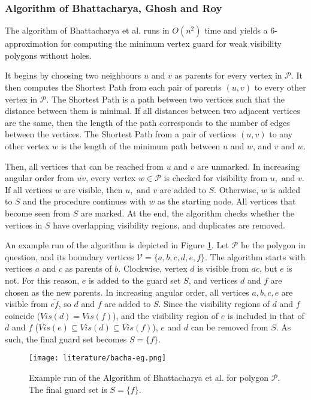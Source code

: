 \subsubsection{Algorithm of Bhattacharya, Ghosh and Roy \cite{bhattacharya2016approximability}}
The algorithm of Bhattacharya et al. \cite{bhattacharya2016approximability} runs in $O(n^2)$ time and yields a 6-approximation for computing the minimum vertex guard for weak visibility polygons without holes. 

It begins by choosing two neighbours $u$ and $v$ as parents for every vertex in $\mathcal P$. It then computes the Shortest Path from each pair of parents $(u, v)$ to every other vertex in $\mathcal P$. The Shortest Path is a path between two vertices such that the distance between them is minimal. If all distances between two adjacent vertices are the same, then the length of the path corresponds to the number of edges between the vertices. The Shortest Path from a pair of vertices $(u, v)$ to any other vertex $w$ is the length of the minimum path between $u$ and $w$, and $v$ and $w$.

Then, all vertices that can be reached from $u$ and $v$ are unmarked. In increasing angular order from $\overline{uv}$, every vertex $w \in \mathcal P$ is checked for visibility from $u, \text{ and } v$. If all vertices $w$ are visible, then $u, \text{ and }v$ are added to $S$. Otherwise, $w$ is added to $S$ and the procedure continues with $w$ as the starting node. All vertices that become seen from $S$ are marked. At the end, the algorithm checks whether the vertices in $S$ have overlapping visibility regions, and duplicates are removed.

An example run of the algorithm is depicted in Figure \ref{fig:bhaca}. Let $\mathcal P$ be the polygon in question, and its boundary vertices $\mathcal V = \{a, b, c, d, e, f\}$. The algorithm starts with vertices $a$ and $c$ as parents of $b$. Clockwise, vertex $d$ is visible from $\overline{ac}$, but $e$ is not. For this reason, $e$ is added to the guard set $S$, and vertices $d$ and $f$ are chosen as the new parents. In increasing angular order, all vertices $a, b, c, e$ are visible from $\overline{ef}$, so $d$ and $f$ are added to $S$. Since the visibility regions of $d$ and $f$ coincide ($Vis(d) = Vis(f)$), and the visibility region of $e$ is included in that of $d$ and $f$ ($Vis(e) \subseteq Vis(d) \subseteq Vis(f)$), $e$ and $d$ can be removed from $S$. As such, the final guard set becomes $S = \{f\}$.

\begin{figure}[h!]
    \centering
    \texttt{[image: literature/bacha-eg.png]}
    \caption{Example run of the Algorithm of Bhattacharya et al. \cite{bhattacharya2016approximability} for polygon $\mathcal P$. The final guard set is $S = \{f\}$.}
    \label{fig:bhaca}
\end{figure}

